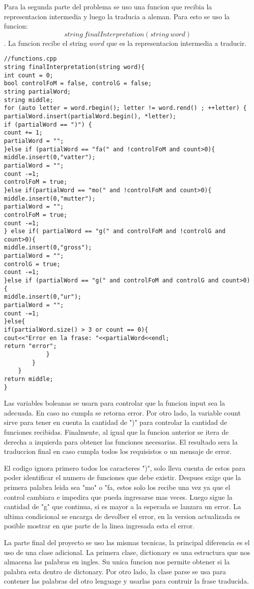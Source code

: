 \documentclass[conference]{IEEEtran}
\begin{document}
Para la segunda parte del problema se uso una funcion que recibia la representacion intermedia y luego la traducia a aleman. Para esto se uso la funcion: 
$$string\  finalInterpretation(string\  word) $$
. La funcion recibe el string $word$ que es la representacion intermedia a traducir. 

\begin{lstlisting}
//functions.cpp
string finalInterpretation(string word){
int count = 0;
bool controlFoM = false, controlG = false;
string partialWord;
string middle;
for (auto letter = word.rbegin(); letter != word.rend() ; ++letter) {
partialWord.insert(partialWord.begin(), *letter);
if (partialWord == ")") {
count += 1;
partialWord = "";
}else if (partialWord == "fa(" and !controlFoM and count>0){
middle.insert(0,"vatter");
partialWord = "";
count -=1;
controlFoM = true;
}else if(partialWord == "mo(" and !controlFoM and count>0){
middle.insert(0,"mutter");
partialWord = "";
controlFoM = true;
count -=1;
} else if( partialWord == "g(" and controlFoM and !controlG and count>0){
middle.insert(0,"gross");
partialWord = "";
controlG = true;
count -=1;
}else if (partialWord == "g(" and controlFoM and controlG and count>0){
middle.insert(0,"ur");
partialWord = "";
count -=1;
}else{
if(partialWord.size() > 3 or count == 0){
cout<<"Error en la frase: "<<partialWord<<endl;
return "error";
			}
		}
	}
return middle;
}
\end{lstlisting}

Las variables boleanas se usarn para controlar que la funcion input sea la adecuada. En caso no cumpla se retorna error. Por otro lado, la variable count sirve para tener en cuenta la cantidad de ")" para controlar la cantidad de funciones recibidas. Finalmente, al igual que la funcion anterior se itera de derecha a izquierda para obtener las funciones necesarias. El resultado sera la traduccion final en caso cumpla todos los requisistos o un mensaje de error.

El codigo ignora primero todos los caracteres ")", solo lleva cuenta de estos para poder identificar el numero de funciones que debe existir. Despues exige que la primera palabra leida sea "mo" o "fa, estos solo los recibe una vez ya que el control cambiara e impedira que pueda ingresarse mas veces. Luego sigue la cantidad de "g" que continua, si es mayor a la esperada se lanzara un error. La ultima condicional se encarga de devolber el error, en la version actualizada es posible mostrar en que parte de la linea ingresada esta el error. 

La parte final del proyecto se uso las mismas tecnicas, la principal diferencia es el uso de una clase adicional. La primera clase, dictionary es una estructura que nos almacena las palabras en ingles. Su unica funcion nos permite obtener si la palabra esta dentro de dictonary. Por otro lado, la clase parse se usa para contener las palabras del otro lenguage y usarlas para contruir la frase traducida.
\end{document}
